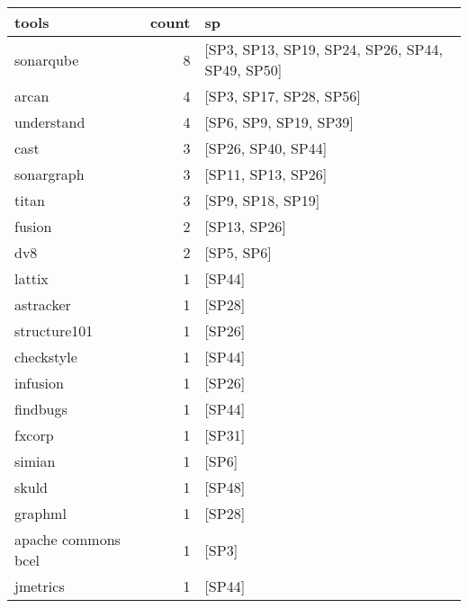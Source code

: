 \begin{tabular}{lrl}
\toprule
               tools &  count &                                               sp \\
\midrule
           sonarqube &      8 &  [SP3, SP13, SP19, SP24, SP26, SP44, SP49, SP50] \\
               arcan &      4 &                          [SP3, SP17, SP28, SP56] \\
          understand &      4 &                           [SP6, SP9, SP19, SP39] \\
                cast &      3 &                               [SP26, SP40, SP44] \\
          sonargraph &      3 &                               [SP11, SP13, SP26] \\
               titan &      3 &                                [SP9, SP18, SP19] \\
              fusion &      2 &                                     [SP13, SP26] \\
                 dv8 &      2 &                                       [SP5, SP6] \\
              lattix &      1 &                                           [SP44] \\
           astracker &      1 &                                           [SP28] \\
        structure101 &      1 &                                           [SP26] \\
          checkstyle &      1 &                                           [SP44] \\
            infusion &      1 &                                           [SP26] \\
            findbugs &      1 &                                           [SP44] \\
              fxcorp &      1 &                                           [SP31] \\
              simian &      1 &                                            [SP6] \\
               skuld &      1 &                                           [SP48] \\
             graphml &      1 &                                           [SP28] \\
 apache commons bcel &      1 &                                            [SP3] \\
            jmetrics &      1 &                                           [SP44] \\

\end{tabular}
